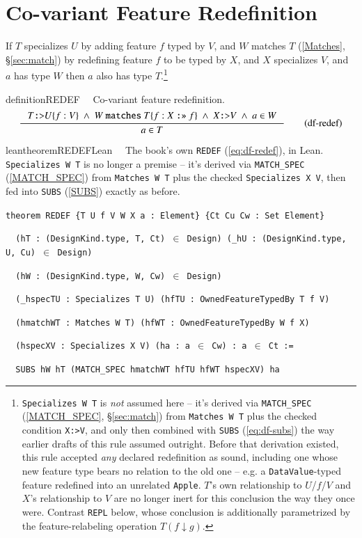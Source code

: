 \section{Co-variant Feature Redefinition}
If $T$ specializes $U$ by adding feature $f$ typed by $V$, and $W$ matches $T$ (\ref{Matches},
\S\ref{sec:match}) by redefining feature $f$ to be typed by $X$, and $X$ specializes $V$, and $a$ has
type $W$ then $a$ also has type $T$.\footnote{\texttt{Specializes W T} is \emph{not} assumed here --
it's derived via \texttt{MATCH\_SPEC} (\ref{MATCH_SPEC}, \S\ref{sec:match}) from \texttt{Matches W T}
plus the checked condition \texttt{X:>V}, and only then combined with \texttt{SUBS} (\ref{eq:df-subs})
the way earlier drafts of this rule assumed outright. Before that derivation existed, this rule
accepted \emph{any} declared redefinition as sound, including one whose new feature type bears no
relation to the old one -- e.g. a \texttt{DataValue}-typed feature redefined into an unrelated
\texttt{Apple}. $T$'s own relationship to $U$/$f$/$V$ and $X$'s relationship to $V$ are no longer
inert for this conclusion the way they once were. Contrast \texttt{REPL} below, whose conclusion is
additionally parametrized by the feature-relabeling operation $T(f \downarrow g)$.}
\begin{restatable}{definition}{REDEF}~~   Co-variant feature redefinition.
\begin{align}
\inference
{T\texttt{:>}U\{f:V\}~\wedge~W~\texttt{matches}~T\{f:X~\texttt{:>>}~f\}~\wedge~X\texttt{:>}V ~\wedge~a \in W}
{a \in T}
\label{eq:df-redef}\tag{df-redef}
\end{align}
\end{restatable}

\begin{restatable}{leantheorem}{REDEFLean}~~ The book's own \texttt{REDEF}
(\ref{eq:df-redef}), in Lean. \texttt{Specializes W T} is no longer a premise -- it's derived via
\texttt{MATCH\_SPEC} (\ref{MATCH_SPEC}) from \texttt{Matches W T} plus the checked
\texttt{Specializes X V}, then fed into \texttt{SUBS} (\ref{SUBS}) exactly as before.

\texttt{\textcolor{leancolor}{theorem} \textcolor{leanyellow}{REDEF} \{T U f V W X a : Element\} \{Ct Cu Cw : Set Element\}}

\texttt{~~(hT : (DesignKind.type, T, Ct) $\in$ Design) (\_hU : (DesignKind.type, U, Cu) $\in$ Design)}

\texttt{~~(hW : (DesignKind.type, W, Cw) $\in$ Design)}

\texttt{~~(\_hspecTU : Specializes T U) (hfTU : OwnedFeatureTypedBy T f V)}

\texttt{~~(hmatchWT : Matches W T) (hfWT : OwnedFeatureTypedBy W f X)}

\texttt{~~(hspecXV : Specializes X V) (ha : a $\in$ Cw) : a $\in$ Ct :=}

\texttt{~~SUBS hW hT (MATCH\_SPEC hmatchWT hfTU hfWT hspecXV) ha}
\label{REDEF}
\end{restatable}

